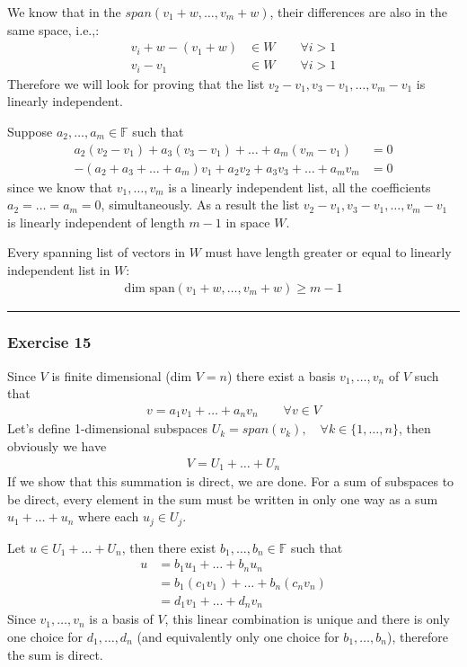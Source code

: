 \documentclass[12pt, letterpaper]{scrartcl}
\newcommand{\F}{\mathbb{F}}
\begin{document}
We know that in the $span(v_1+w, \dots, v_m+w)$, their differences are also in the same space, i.e.,:
\begin{align*}
    v_i+w-(v_1+w) &\in W \qquad\forall i>1\\
    v_i-v_1 &\in W \qquad\forall i>1
\end{align*}
Therefore we will look for proving that the list $v_2-v_1, v_3-v_1,\dots,v_m-v_1$ is linearly independent.

Suppose $a_2,\dots,a_m\in\F$ such that
\begin{align*}
    a_2(v_2-v_1)+ a_3(v_3-v_1)+\dots+a_m(v_m-v_1)&=0\\
    -(a_2+a_3+\dots+a_m)v_1+a_2v_2+a_3v_3+\dots+a_mv_m&=0
\end{align*}
since we know that $v_1, \dots, v_m$ is a linearly independent list, all the coefficients $a_2=\dots=a_m=0$, simultaneously. As a result the list $v_2-v_1, v_3-v_1,\dots,v_m-v_1$ is linearly independent of length $m-1$ in space $W$.

Every spanning list of vectors in $W$ must have length greater or equal to linearly independent list in $W$: 
\begin{align*}
    \text{dim span}(v_1+w, \dots, v_m+w) \geq m-1
\end{align*}
\vskip1mm\hrule

\subsubsection*{Exercise 15}
Since $V$ is finite dimensional (dim $V=n$) there exist a basis $v_1,\dots,v_n$ of $V$ such that
\begin{align*}
    v = a_1v_1+\dots+a_nv_n \qquad \forall v\in V
\end{align*}
Let's define 1-dimensional subspaces $U_k=span(v_k) ,\quad \forall k\in \{1,\dots,n\}$, then obviously we have
\begin{align*}
    V=U_1+\dots+U_n
\end{align*}
If we show that this summation is direct, we are done. For a sum of subspaces to be direct, every element in the sum must be written in only one way as a sum $u_1+\dots+u_n$ where each $u_j\in U_j$.

Let $u\in U_1+\dots+U_n$, then there exist $b_1,\dots,b_n\in\F$ such that
\begin{align*}
    u&=b_1u_1+\dots+b_nu_n\\
    &=b_1(c_1v_1)+\dots+b_n(c_nv_n)\\
    &=d_1v_1+\dots+d_nv_n
\end{align*}
Since $v_1,\dots,v_n$ is a basis of $V$, this linear combination is unique and there is only one choice for $d_1,\dots,d_n$ (and equivalently only one choice for $b_1,\dots,b_n$), therefore the sum is direct.
\end{document}
